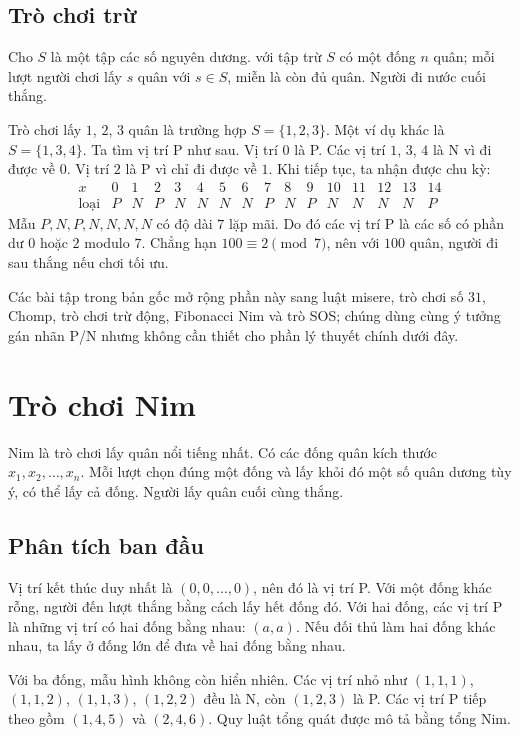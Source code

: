 \documentclass[11pt]{article}
\begin{document}
\subsection{Trò chơi trừ}

Cho \(S\) là một tập các số nguyên dương.  với tập trừ
\(S\) có một đống \(n\) quân; mỗi lượt người chơi lấy \(s\) quân với
\(s\in S\), miễn là còn đủ quân. Người đi nước cuối thắng.

Trò chơi lấy \(1\), \(2\), \(3\) quân là trường hợp \(S=\{1,2,3\}\). Một ví dụ
khác là \(S=\{1,3,4\}\). Ta tìm vị trí P như sau. Vị trí \(0\) là P. Các vị
trí \(1\), \(3\), \(4\) là N vì đi được về \(0\). Vị trí \(2\) là P vì chỉ đi
được về \(1\). Khi tiếp tục, ta nhận được chu kỳ:
\[
\begin{array}{c|ccccccccccccccc}
x&0&1&2&3&4&5&6&7&8&9&10&11&12&13&14\\ \hline
\text{loại}&P&N&P&N&N&N&N&P&N&P&N&N&N&N&P
\end{array}
\]
Mẫu \(P,N,P,N,N,N,N\) có độ dài \(7\) lặp mãi. Do đó các vị trí P là các số
có phần dư \(0\) hoặc \(2\) modulo \(7\). Chẳng hạn \(100\equiv2\pmod 7\), nên
với \(100\) quân, người đi sau thắng nếu chơi tối ưu.

Các bài tập trong bản gốc mở rộng phần này sang luật misere, trò chơi số \(31\),
Chomp, trò chơi trừ động, Fibonacci Nim và trò SOS; chúng dùng cùng ý tưởng gán
nhãn P/N nhưng không cần thiết cho phần lý thuyết chính dưới đây.

\section{Trò chơi Nim}

Nim là trò chơi lấy quân nổi tiếng nhất. Có các đống quân kích thước
\(x_1,x_2,\ldots,x_n\). Mỗi lượt chọn đúng một đống và lấy khỏi đó một số quân
dương tùy ý, có thể lấy cả đống. Người lấy quân cuối cùng thắng.

\subsection{Phân tích ban đầu}

Vị trí kết thúc duy nhất là \((0,0,\ldots,0)\), nên đó là vị trí P. Với một
đống khác rỗng, người đến lượt thắng bằng cách lấy hết đống đó. Với hai đống,
các vị trí P là những vị trí có hai đống bằng nhau: \((a,a)\). Nếu đối thủ làm
hai đống khác nhau, ta lấy ở đống lớn để đưa về hai đống bằng nhau.

Với ba đống, mẫu hình không còn hiển nhiên. Các vị trí nhỏ như
\((1,1,1)\), \((1,1,2)\), \((1,1,3)\), \((1,2,2)\) đều là N, còn
\((1,2,3)\) là P. Các vị trí P tiếp theo gồm \((1,4,5)\) và \((2,4,6)\). Quy
luật tổng quát được mô tả bằng tổng Nim.
\end{document}

